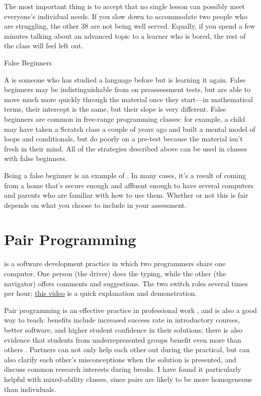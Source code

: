 The most important thing is to accept that no single lesson can possibly
meet everyone's individual needs. If you slow down to accommodate two
people who are struggling, the other 38 are not being well served.
Equally, if you spend a few minutes talking about an advanced topic to a
learner who is bored, the rest of the class will feel left out.

\begin{aside}{False Beginners}

A  is someone who has
studied a language before but is learning it again. False beginners
may be indistinguishable from
 on preassessment
tests, but are able to move much more quickly through the material
once they start---in mathematical terms, their intercept is the same,
but their slope is very different. False beginners are common in
free-range programming classes: for example, a child may have taken a
Scratch class a couple of years ago and built a mental model of loops
and conditionals, but do poorly on a pre-test because the material
isn't fresh in their mind. All of the strategies described above can
be used in classes with false beginners.

Being a false beginner is an example of
\cite{Marg2010}. In many cases, it's a result of coming from a home
that's secure enough and affluent enough to have several computers and
parents who are familiar with how to use them. Whether or not this is
fair depends on what you choose to include in your assessment.

\end{aside}

\section{Pair Programming}\label{s:classroom-pair}

 is a software development
practice in which two programmers share one computer. One person (the
driver) does the typing, while the other (the navigator) offers
comments and suggestions. The two switch roles several times per hour;
\href{https://www.youtube.com/watch?v=vgkahOzFH2Q}{this video} is a quick explanation and
demonstration.

Pair programming is an effective practice in professional work
\cite{Hann2009}, and is also a good way to teach: benefits include
increased success rate in introductory courses, better software, and
higher student confidence in their solutions; there is also evidence
that students from underrepresented groups benefit even more than
others
\cite{McDo2006,Hank2011,Port2013,Cele2018}.
Partners can not only help each other out during the practical, but
can also clarify each other's misconceptions when the solution is
presented, and discuss common research interests during breaks. I have
found it particularly helpful with mixed-ability classes, since pairs
are likely to be more homogeneous than individuals.

